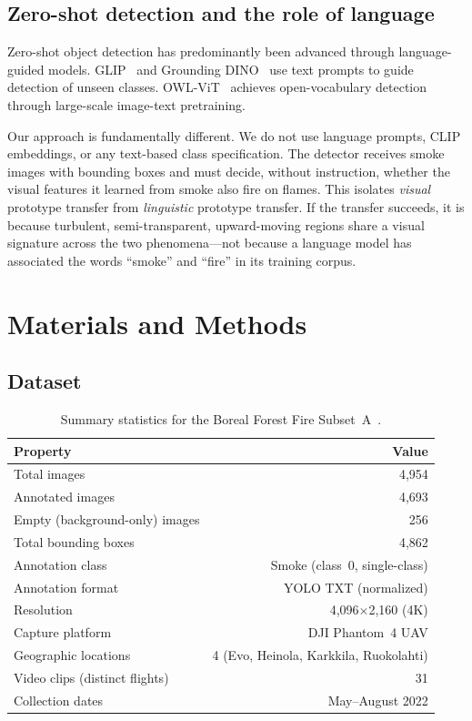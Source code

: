 \documentclass[10pt,twocolumn]{article}
\begin{document}
\subsection{Zero-shot detection and the role of language}

Zero-shot object detection has predominantly been advanced through language-guided models. GLIP~\cite{li2022grounded} and Grounding DINO~\cite{liu2023grounding} use text prompts to guide detection of unseen classes. OWL-ViT~\cite{minderer2022simple} achieves open-vocabulary detection through large-scale image-text pretraining.

Our approach is fundamentally different. We do not use language prompts, CLIP embeddings, or any text-based class specification. The detector receives smoke images with bounding boxes and must decide, without instruction, whether the visual features it learned from smoke also fire on flames. This isolates \textit{visual} prototype transfer from \textit{linguistic} prototype transfer. If the transfer succeeds, it is because turbulent, semi-transparent, upward-moving regions share a visual signature across the two phenomena---not because a language model has associated the words ``smoke'' and ``fire'' in its training corpus.

\section{Materials and Methods}

\subsection{Dataset}

\begin{table}[H]
\centering
\caption{Summary statistics for the Boreal Forest Fire Subset~A~\cite{pesonen2025boreal}.}
\label{tab:dataset}
\begin{tabular}{@{}lr@{}}
\toprule
\textbf{Property} & \textbf{Value} \\
\midrule
Total images                     & 4,954 \\
Annotated images                 & 4,693 \\
Empty (background-only) images   & 256 \\
Total bounding boxes             & 4,862 \\
Annotation class                 & Smoke (class~0, single-class) \\
Annotation format                & YOLO TXT (normalized) \\
Resolution                       & 4,096\(\times\)2,160 (4K) \\
Capture platform                 & DJI Phantom~4 UAV \\
Geographic locations             & 4 (Evo, Heinola, Karkkila, Ruokolahti) \\
Video clips (distinct flights)   & 31 \\
Collection dates                 & May--August 2022 \\
\bottomrule
\end{tabular}
\end{table}
\end{document}
